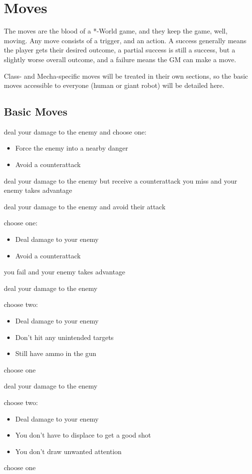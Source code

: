 \section{Moves}
The moves are the blood of a *-World game, and they keep the game, well, moving. Any move consists of a trigger, and an action. A success generally means the player gets their desired outcome, a partial success is still a success, but a slightly worse overall outcome, and a failure means the GM can make a move.

Class- and Mecha-specific moves will be treated in their own sections, so the basic moves accessible to everyone (human or giant robot) will be detailed here.

\subsection{Basic Moves}

{deal your damage to the enemy and choose one:
\begin{itemize}
\item Force the enemy into a nearby danger
\item Avoid a counterattack
\end{itemize}}
{deal your damage to the enemy but receive a counterattack}
{you miss and your enemy takes advantage}

{deal your damage to the enemy and avoid their attack}
{choose one:
\begin{itemize}
\item Deal damage to your enemy
\item Avoid a counterattack
\end{itemize}}
{you fail and your enemy takes advantage}

{deal your damage to the enemy}
{choose two:
\begin{itemize}
\item Deal damage to your enemy
\item Don't hit any unintended targets
\item Still have ammo in the gun
\end{itemize}}
{choose one}

{deal your damage to the enemy}
{choose two:
\begin{itemize}
\item Deal damage to your enemy
\item You don't have to displace to get a good shot
\item You don't draw unwanted attention
\end{itemize}}
{choose one}

